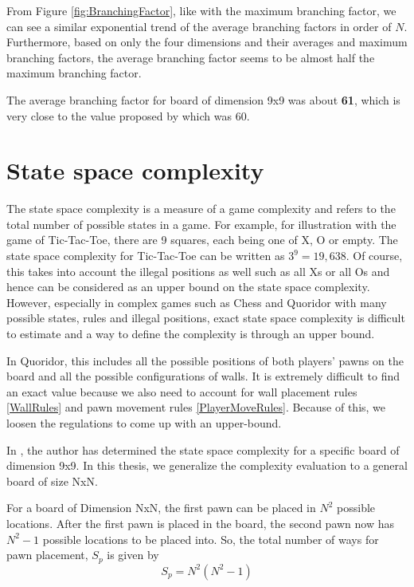 From Figure \ref{fig:BranchingFactor}, like with the maximum branching factor, we can see a similar exponential trend of the average branching factors in order of $N$. Furthermore, based on only the four dimensions and their averages and maximum branching factors, the average branching factor seems to be almost half the maximum branching factor.

The average branching factor for board of dimension 9x9 was about \textbf{61}, which is very close to the value proposed by \citep{Glendenning2002MasteringQ} which was 60.

\section{State space complexity}

The state space complexity is a measure of a game complexity and refers to the total number of possible states in a game. For example, for illustration with the game of Tic-Tac-Toe, there are 9 squares, each being one of X, O or empty. The state space complexity for Tic-Tac-Toe can be written as $3^9 = 19,638$. Of course, this takes into account the illegal positions as well such as all Xs or all Os and hence can be considered as an upper bound on the state space complexity. However, especially in complex games such as Chess and Quoridor with many possible states, rules and illegal positions, exact state space complexity is difficult to estimate and a way to define the complexity is through an upper bound.  

In Quoridor, this includes all the possible positions of both players' pawns on the board and all the possible configurations of walls. It is extremely difficult to find an exact value because we also need to account for wall placement rules \ref{WallRules} and pawn movement rules \ref{PlayerMoveRules}. Because of this, we loosen the regulations to come up with an upper-bound.

In \citep{Mertens2006Quoridor}, the author has determined the state space complexity for a specific board of dimension 9x9. In this thesis, we generalize the complexity evaluation to a general board of size NxN.

For a board of Dimension NxN, the first pawn can be placed in $N^2$ possible locations. After the first pawn is placed in the board, the second pawn now has $N^2-1$ possible locations to be placed into. So, the total number of ways for pawn placement, $S_p$ is given by
\begin{equation}
    S_p = N^2(N^2 - 1)
\end{equation}

